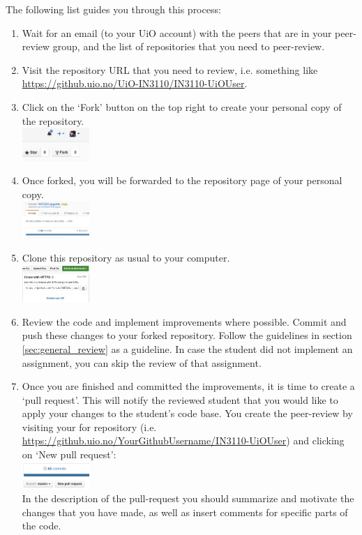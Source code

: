 \documentclass[a4paper]{article}
\begin{document}
The following list guides you through this process:
\begin{enumerate}
	\item Wait for an email (to your UiO account) with the peers that are in your peer-review group, and the list of repositories that you need to peer-review.
	\item Visit the repository URL that you need to review, i.e. something like \\ \url{https://github.uio.no/UiO-IN3110/IN3110-UiOUser}.
\item Click on the `Fork' button on the top right to create your personal copy of the repository. 
\\
\includegraphics[width=0.2\textwidth]{Selection_001}
\item Once forked, you will be forwarded to the repository page of your personal copy.
\\
\includegraphics[width=0.2\textwidth]{Selection_003}
\item Clone this repository as usual to your computer.
\\
\includegraphics[width=0.2\textwidth]{Selection_005}
\item Review the code and implement improvements where possible. Commit and push these changes to your forked repository. Follow the guidelines in section \ref{sec:general_review} as a guideline. In case the student did not implement an assignment, you can skip the review of that assignment. 
\\
\item Once you are finished and committed the improvements, it is time to create a `pull request'. This will notify the reviewed student that you would like to apply your changes to the student's code base. You create the peer-review by visiting your for repository (i.e. \url{https://github.uio.no/YourGithubUsername/IN3110-UiOUser}) and clicking on `New pull request':
\\
\includegraphics[width=0.2\textwidth]{Selection_006}
\\
In the description of the pull-request you should summarize and motivate the changes that you have made, as well as insert comments for specific parts of the code.
\end{enumerate}
\end{document}
